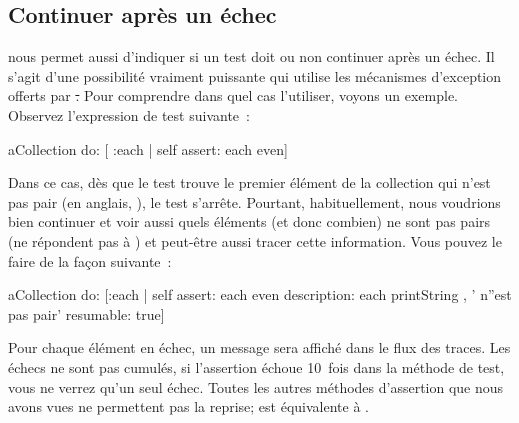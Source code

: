 \documentclass[a4paper,10pt,twoside]{book}
\begin{document}
\subsection{Continuer après un échec}
\sunit nous permet aussi d'indiquer si un test doit ou non continuer après un échec. Il s'agit 
d'une possibilité vraiment puissante qui utilise les mécanismes d'exception offerts par \st. 
Pour comprendre dans quel cas l'utiliser, voyons un exemple. Observez l'expression de test suivante~:
\begin{code}{}
aCollection do: [ :each | self assert: each even]
\end{code}
Dans ce cas, dès que le test trouve le premier élément de la collection qui n'est pas 
pair (en anglais, ), le test s'arrête. Pourtant, habituellement, nous voudrions 
bien continuer et voir aussi quels éléments (et donc combien) ne sont pas 
pairs (\ie ne répondent pas à ) et peut-être aussi tracer cette information. 
Vous pouvez le faire de la façon suivante~:
\begin{code}{}
aCollection do:
	[:each |
	self
		assert: each even
		description: each printString , ' n''est pas pair'
		resumable: true]
\end{code}
Pour chaque élément en échec, un message sera affiché dans le flux des traces. Les échecs ne sont 
pas cumulés, \ie si l'assertion échoue 10~fois dans la méthode de test, vous ne verrez qu'un 
seul échec. Toutes les autres méthodes d'assertion que nous avons vues ne permettent pas la reprise;
 est équivalente à .

\end{document}
